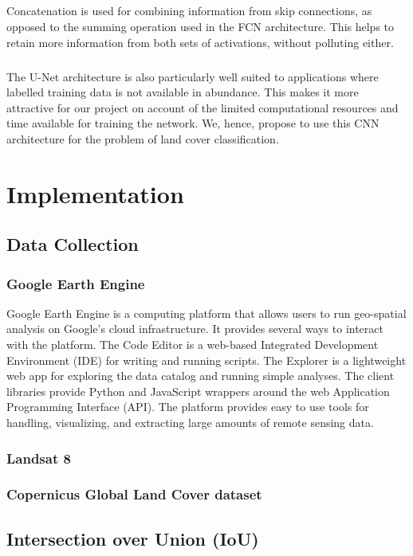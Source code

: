 \documentclass[12pt, a4paper]{report}
\begin{document}
\paragraph{}
Concatenation is used for combining information from skip connections, as opposed to the summing operation used in the FCN architecture. This helps to retain more information from both sets of activations, without polluting either.
\paragraph{}
The U-Net architecture is also particularly well suited to applications where labelled training data is not available in abundance. This makes it more attractive for our project on account of the limited computational resources and time available for training the network. We, hence, propose to use this CNN architecture for the problem of land cover classification.
\chapter{Implementation}
\section{Data Collection}
\subsection{Google Earth Engine}
Google Earth Engine is a computing platform that allows users to run geo-spatial analysis on Google's cloud infrastructure. It provides several ways to interact with the platform. The Code Editor is a web-based Integrated Development Environment (IDE) for writing and running scripts. The Explorer is a lightweight web app for exploring the data catalog and running simple analyses. The client libraries provide Python and JavaScript wrappers around the web Application Programming Interface (API). The platform provides easy to use tools for handling, visualizing, and extracting large amounts of remote sensing data.\cite{gee1}
\subsection{Landsat 8}

\subsection{Copernicus Global Land Cover dataset}
\section{Intersection over Union (IoU)}
\end{document}
